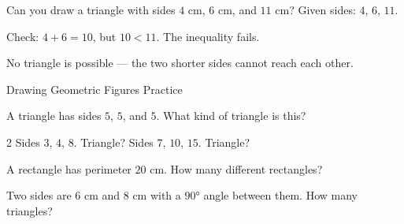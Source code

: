 \begin{stepExample}{Can you draw a triangle with sides $4$ cm, $6$ cm, and $11$ cm?}
     Given sides: $4$, $6$, $11$.

     Check: $4 + 6 = 10$, but $10 < 11$. The inequality fails.

     No triangle is possible --- the two shorter sides cannot reach each other.
\end{stepExample}


\newpage
\begin{stepPractice}{Drawing Geometric Figures Practice}
    \resetProblems

    \prob A triangle has sides $5$, $5$, and $5$. What kind of triangle is this? \answerBlank[2.5cm]

    \begin{multicols}{2}
    \prob Sides $3$, $4$, $8$. Triangle? \answerBlank[2cm]
    \prob Sides $7$, $10$, $15$. Triangle? \answerBlank[2cm]
    \end{multicols}

    \prob A rectangle has perimeter $20$ cm. How many different rectangles? \answerBlank[2.5cm]

    \prob Two sides are $6$ cm and $8$ cm with a $90°$ angle between them. How many triangles? \answerBlank[2cm]

\end{stepPractice}
